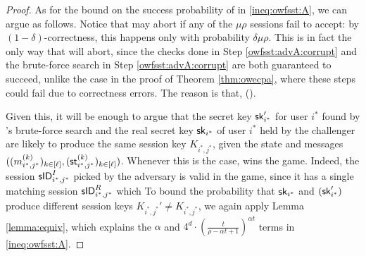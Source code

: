 \begin{proof}
  As for the bound on the success probability of \advA in \eqref{ineq:owfsst:A},
  we can argue as follows.
  Notice that \advA may abort if any of the \(\mu \rho\) sessions fail to accept:
  by \((1-\delta)\)-correctness, this happens only with probability \(\delta \mu \rho\).
  This is in fact the only way that \advA will abort,
  since the checks done in Step \ref{owfsst:advA:corrupt}
  and the brute-force search in Step \ref{owfsst:advA:corrupt}
  are both guaranteed to succeed,
  unlike the case in the proof of Theorem \ref{thm:owecpa},
  where these steps could fail due to correctness errors.
  The reason is that, ().

  Given this, it will be enough to argue that the secret key \(\mathsf{sk}_{i^{*}}'\) for user \(i^{*}\)
  found by \advA's brute-force search and
  the real secret key \(\mathsf{sk}_{i^{*}}\) of user \(i^{*}\) held by the challenger
  are likely to produce the same session key \(K_{i^{*},j^{*}}\),
  given the state and messages \(((m_{i^{*},j^{*}}^{(k)})_{k \in [\ell]},(\mathsf{st}_{i^{*},j^{*}}^{(k)})_{k \in [\ell]})\).
  Whenever this is the case, \advA wins the \OwFSst game.
  Indeed, the session \(\mathsf{sID}_{i^{*},j^{*}}^{I}\) picked by the adversary is valid in the \OwFSst game,
  since it has a single matching session \(\mathsf{sID}_{i^{*},j^{*}}^{R}\) which 
  To bound the probability that
  \(\mathsf{sk}_{i^{*}}\) and \((\mathsf{sk}_{i^{*}}')\) produce different session keys \(K_{i^{*},j^{*}}' \ne K_{i^{*},j^{*}}\),
  we again apply Lemma \ref{lemma:equiv},
  which explains the \(\alpha\) and
  \(
    4^{d} \cdot \left( \frac{t}{\rho - \alpha t + 1} \right)^{\alpha t}
  \)
  terms in \eqref{ineq:owfsst:A}.
\end{proof}



